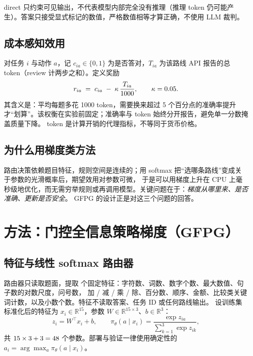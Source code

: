 \documentclass[a4paper,zihao=5,linespread=1.38]{ctexart}
\newcommand{\act}[1]{\textsf{#1}}
\newcommand{\R}{\mathbb{R}}
\begin{document}
\act{direct} 只约束可见输出，不代表模型内部完全没有推理（推理 token 仍可能产生）。答案只接受显式标记的数值，严格数值相等才算正确，不使用 LLM 裁判。

\subsection{成本感知效用}
对任务 $i$ 与动作 $a$，记 $c_{ia}\in\{0,1\}$ 为是否答对，$T_{ia}$ 为该路线 API 报告的总 token（\act{review} 计两步之和）。定义奖励
\begin{equation}\label{eq:reward}
  r_{ia} \;=\; c_{ia} \;-\; \kappa\,\frac{T_{ia}}{1000},\qquad \kappa=0.05 .
\end{equation}
其含义是：平均每题多花 1000 token，需要换来超过 5 个百分点的准确率提升才“划算”。该权衡在实验前固定；准确率与 token 始终分开报告，避免单一分数掩盖质量下降。
token 是计算开销的代理指标，不等同于货币价格。

\subsection{为什么用梯度类方法}
路由决策依赖题目特征，规则空间是连续的；用 softmax 把“选哪条路线”变成关于参数的光滑概率后，期望效用对参数可微，
于是可以用梯度上升在 CPU 上毫秒级地优化，而无需穷举规则或再调用模型。关键问题在于：\emph{梯度从哪里来、是否准确、更新是否安全}。
GFPG 的设计正是对这三个问题的回答。

\section{方法：门控全信息策略梯度（GFPG）}\label{sec:method}

\subsection{特征与线性 softmax 路由器}
路由器只读取题面，提取 \numFeatures{} 个固定特征：字符数、词数、数字个数、最大数值、句子数的对数尺度，问号数，
加 / 减 / 乘 / 除、百分数、顺序、金额、比较类关键词计数，以及小数个数。特征不读取答案、任务 ID 或任何路线输出。
设训练集标准化后的特征为 $x_i\in\R^{15}$，参数 $W\in\R^{15\times3}$、$b\in\R^3$：
\begin{equation}\label{eq:policy}
  z_i = W^{\top}x_i + b,\qquad
  \pi_\theta(a\mid x_i)=\frac{\exp z_{ia}}{\sum_{k=1}^{3}\exp z_{ik}},
\end{equation}
共 $15\times3+3=48$ 个参数。部署与验证一律使用确定性的 $a_i=\arg\max_a\pi_\theta(a\mid x_i)$。
\end{document}
